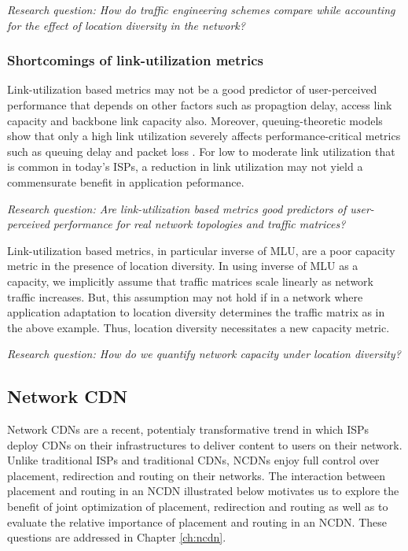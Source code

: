 \emph{Research question: How do traffic engineering schemes compare while accounting for the effect of location diversity in the network?}

\subsubsection{Shortcomings of link-utilization metrics}
\label{sec:bg-poormlu}


Link-utilization based metrics may not be a good predictor of user-perceived performance that depends on other factors such as propagtion delay, access link capacity and backbone link capacity also. Moreover, queuing-theoretic models show that only a high link utilization severely affects performance-critical metrics such as queuing delay and packet loss \cite{mm1}. For low to moderate link utilization that is common in today's ISPs, a reduction in link utilization may not yield a commensurate benefit in application peformance. 

\emph{Research question: Are link-utilization based metrics good predictors of user-perceived performance for real network topologies and traffic matrices?}

Link-utilization based metrics, in particular inverse of MLU, are a poor capacity metric in the presence of location diversity. In using inverse of MLU as a capacity, we implicitly assume that traffic matrices scale linearly as network traffic increases. 
But, this assumption may not hold if in a network where application adaptation to location diversity determines the traffic matrix as in the above example. Thus, location diversity necessitates a new capacity metric.

\emph{Research question: How do we quantify network capacity under location diversity?}

\subsection{Network CDN}
\label{sec:bg-ncdn}
Network CDNs are a recent, potentialy transformative trend in which ISPs deploy CDNs on their infrastructures to deliver content to users on their network.  Unlike traditional ISPs and traditional CDNs, NCDNs enjoy full control over placement, redirection and routing on their networks. The interaction between placement and routing in an NCDN illustrated below motivates us to explore the benefit of joint optimization of placement, redirection and routing as well as to evaluate the relative importance of placement and routing in an NCDN. These questions are addressed in Chapter \ref{ch:ncdn}.

